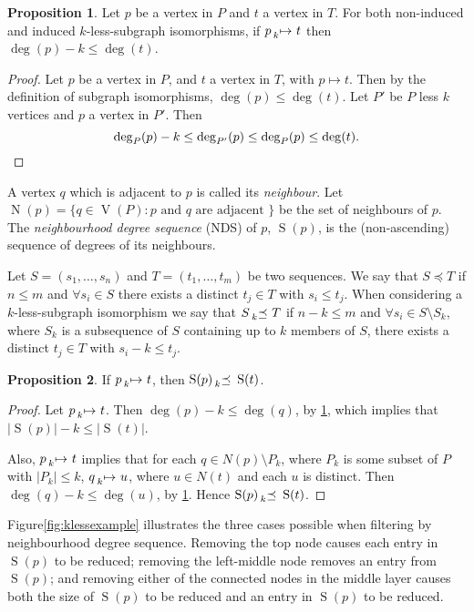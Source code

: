 \documentclass[letterpaper]{article}
\theoremstyle{definition}
\newtheorem{proposition}{Proposition}
\newcommand{\lessmap}[1]{\prescript{}{#1}{\mapsto}\ }
\newcommand{\lesspreceq}[1]{\prescript{}{#1}{\preceq}\ }
\newcommand{\V}{\operatorname{V}}
\newcommand{\N}{\operatorname{N}}
\newcommand{\nds}{\operatorname{S}}
\begin{document}
\begin{proposition}
    \label{prop:deg}
    Let $p$ be a vertex in $P$ and $t$ a vertex in $T$. For both non-induced and induced
    $k$-less-subgraph isomorphisms, if $p \lessmap{k} t$ then
    $\deg(p) - k \le \deg(t)$.
\end{proposition}
\begin{proof}
Let $p$ be a vertex in $P$, and $t$ a vertex in $T$, with $p\mapsto t$. Then by the definition of subgraph isomorphisms, $\deg(p) \le \deg(t)$. Let $P'$ be $P$ less $k$ vertices and $p$ a vertex in $P'$. Then
\[
\deg_{P}(p)-k \le \deg_{P'}(p) \le \deg_{P}(p) \le \deg(t). \qedhere
\]
\end{proof}

A vertex $q$ which is adjacent to $p$ is called its \emph{neighbour}.  Let $\N(p) = \{ q \in \V(P) :
 p \text{ and } q \text{ are adjacent }\}$ be the set of neighbours of $p$.  The \emph{neighbourhood
degree sequence} (NDS) of $p$, $\nds(p)$, is the (non-ascending) sequence of degrees of its
neighbours.

Let $S = ( s_1 , \ldots , s_n )$ and $T = ( t_1 , \ldots , t_m)$ be two sequences.  We say that $S
\preceq T$ if $n \leq m$ and $\forall s_i \in S$ there exists a distinct $t_j \in T$ with $s_i \leq
t_j$.  When considering a $k$-less-subgraph isomorphism we say that $S \lesspreceq{k}
T$ if $n - k \leq m$ and $\forall s_i \in S \setminus S_k$, where $S_k$ is a subsequence of $S$
containing up to $k$ members of $S$, there exists a distinct $t_j \in T$ with $s_i - k \leq t_j$.


\begin{proposition}\label{prop:nds}
If $p \lessmap{k} t$, then $\nds(p) \lesspreceq{k} \nds(t)$.
\end{proposition}

\begin{proof}
Let $p \lessmap{k} t$.  Then $\deg(p) - k \leq \deg(q)$, by \cref{prop:deg}, which
implies that $\left|\nds(p)\right| -k \leq \left| \nds(t) \right| $.

Also, $p \lessmap{k} t$ implies that for each $q \in N(p) \setminus P_k$, where $P_k$
is some subset of $P$ with $\left| P_k \right| \leq k$, $q \lessmap{k} u$, where $u \in N(t)$ and
each $u$ is distinct.  Then $\deg(q) - k \leq \deg(u)$, by \cref{prop:deg}.  Hence $\nds(p)
\lesspreceq{k} \nds(t)$.
\end{proof}

Figure\ref{fig:klessexample} illustrates the three cases possible when filtering by neighbourhood degree
sequence.  Removing the top node causes each entry in $\nds(p)$ to be reduced; removing the
left-middle node removes an entry from $\nds(p)$; and removing either of the connected nodes in the
middle layer causes both the size of $\nds(p)$ to be reduced and an entry in $\nds(p)$ to be reduced.
\end{document}
